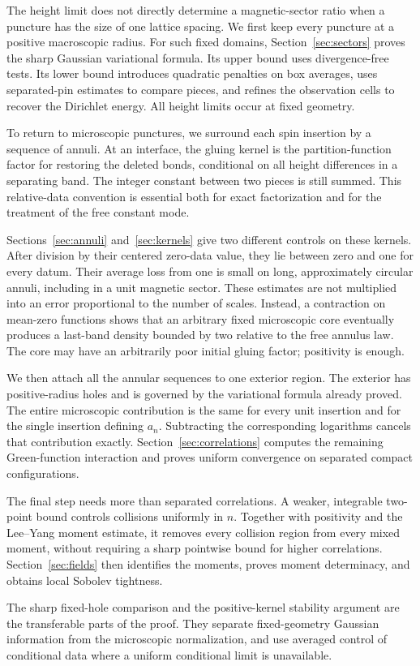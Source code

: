 The height limit does not directly determine a magnetic-sector
ratio when a puncture has the size of one lattice spacing. We first
keep every puncture at a positive macroscopic radius. For such
fixed domains, Section~\ref{sec:sectors} proves the sharp Gaussian
variational formula. Its upper bound uses divergence-free tests.
Its lower bound introduces quadratic penalties on box averages,
uses separated-pin estimates to compare pieces, and refines the
observation cells to recover the Dirichlet energy. All height limits
occur at fixed geometry.

To return to microscopic punctures, we surround each spin insertion
by a sequence of annuli. At an interface, the gluing kernel is the
partition-function factor for restoring the deleted bonds, conditional
on all height differences in a separating band. The integer constant
between two pieces is still summed. This relative-data convention
is essential both for exact factorization and for the treatment of
the free constant mode.

Sections~\ref{sec:annuli} and~\ref{sec:kernels} give two different
controls on these kernels. After division by their centered
zero-data value, they lie between zero and one for every datum.
Their average loss from one is small on long, approximately circular
annuli, including in a unit magnetic sector. These estimates are
not multiplied into an error proportional to the number of scales.
Instead, a contraction on mean-zero functions shows that an
arbitrary fixed microscopic core eventually produces a last-band
density bounded by two relative to the free annulus law. The core
may have an arbitrarily poor initial gluing factor; positivity is
enough.

We then attach all the annular sequences to one exterior region.
The exterior has positive-radius holes and is governed by the
variational formula already proved. The entire microscopic
contribution is the same for every unit insertion and for the
single insertion defining \(a_n\). Subtracting the corresponding
logarithms cancels that contribution exactly. Section~\ref{sec:correlations}
computes the remaining Green-function interaction and proves
uniform convergence on separated compact configurations.

The final step needs more than separated correlations. A weaker,
integrable two-point bound controls collisions uniformly in \(n\).
Together with positivity and the Lee--Yang moment estimate, it
removes every collision region from every mixed moment, without
requiring a sharp pointwise bound for higher correlations.
Section~\ref{sec:fields} then identifies the moments, proves
moment determinacy, and obtains local Sobolev tightness.

The sharp fixed-hole comparison and the positive-kernel stability
argument are the transferable parts of the proof. They separate
fixed-geometry Gaussian information from the microscopic
normalization, and use averaged control of conditional data where
a uniform conditional limit is unavailable.
